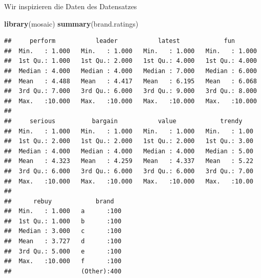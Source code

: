 \documentclass[12pt,ngerman,a4paper,ignorenonframetext,]{beamer}
\newenvironment{Shaded}{\begin{snugshade}}{\end{snugshade}}
\newcommand{\KeywordTok}[1]{\textcolor[rgb]{0.13,0.29,0.53}{\textbf{#1}}}
\newcommand{\NormalTok}[1]{#1}
\begin{document}
\begin{frame}{Wir inspizieren die Daten des Datensatzes}
\protect\hypertarget{wir-inspizieren-die-daten-des-datensatzes}{}

\begin{Shaded}
\begin{Highlighting}[]
\KeywordTok{library}\NormalTok{(mosaic)}
\KeywordTok{summary}\NormalTok{(brand.ratings)}
\end{Highlighting}
\end{Shaded}

\begin{verbatim}
##     perform           leader           latest            fun        
##  Min.   : 1.000   Min.   : 1.000   Min.   : 1.000   Min.   : 1.000  
##  1st Qu.: 1.000   1st Qu.: 2.000   1st Qu.: 4.000   1st Qu.: 4.000  
##  Median : 4.000   Median : 4.000   Median : 7.000   Median : 6.000  
##  Mean   : 4.488   Mean   : 4.417   Mean   : 6.195   Mean   : 6.068  
##  3rd Qu.: 7.000   3rd Qu.: 6.000   3rd Qu.: 9.000   3rd Qu.: 8.000  
##  Max.   :10.000   Max.   :10.000   Max.   :10.000   Max.   :10.000  
##                                                                     
##     serious          bargain           value            trendy     
##  Min.   : 1.000   Min.   : 1.000   Min.   : 1.000   Min.   : 1.00  
##  1st Qu.: 2.000   1st Qu.: 2.000   1st Qu.: 2.000   1st Qu.: 3.00  
##  Median : 4.000   Median : 4.000   Median : 4.000   Median : 5.00  
##  Mean   : 4.323   Mean   : 4.259   Mean   : 4.337   Mean   : 5.22  
##  3rd Qu.: 6.000   3rd Qu.: 6.000   3rd Qu.: 6.000   3rd Qu.: 7.00  
##  Max.   :10.000   Max.   :10.000   Max.   :10.000   Max.   :10.00  
##                                                                    
##      rebuy            brand    
##  Min.   : 1.000   a      :100  
##  1st Qu.: 1.000   b      :100  
##  Median : 3.000   c      :100  
##  Mean   : 3.727   d      :100  
##  3rd Qu.: 5.000   e      :100  
##  Max.   :10.000   f      :100  
##                   (Other):400
\end{verbatim}

\end{frame}
\end{document}
